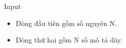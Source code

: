 Input
\begin{itemize}
	\item     Dòng đầu tiên gồm số nguyên N.   
	\item     Dòng thứ hai gồm N số mô tả dãy.   
\end{itemize}